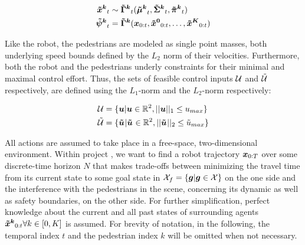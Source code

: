 \begin{align}
\xped[k]_t &\sim \distmodel[k]_t(\muped[k]_t, \sigmaped[k]_t, \piped[k]_t) \\
\dist[k]_t &= \distmodel[k] (\x_{0:t}, \xped[0]_{0:t}, \hdots, \xped[K]_{0:t})
\end{align}

Like the robot, the pedestrians are modeled as single point masses, both underlying speed bounds defined by the $L_2$ norm of their velocities. Furthermore, both the robot and the pedestrians underly constraints for their minimal and maximal control effort. Thus, the sets of feasible control inputs $
\mathcal{U}$ and $\mathcal{\tilde{U}}$ respectively, are defined using the $L_1$-norm and the $L_2$-norm respectively:

\begin{align}
\uset &= \{\u | \u \in \mathbb{R}^2, ||\u||_1 \leq u_{max}\} \\
\upedset &= \{\uped[] | \uped[] \in \mathbb{R}^2, ||\uped[]||_2 \leq \tilde{u}_{max}\} 
\label{eq:controls_bounds}
\end{align}
 
All actions are assumed to take place in a free-space, two-dimensional environment. 
\newline
Within project \project, we want to find a robot trajectory $\boldsymbol{x}_{0:T}$ over some discrete-time horizon $N$ that makes trade-offs between minimizing the travel time from its current state to some goal state in $\mathcal{X}_f = \{\boldsymbol{g} | \boldsymbol{g} \in \mathcal{X} \}$ on the one side and the interference with the pedestrians in the scene, concerning its dynamic as well as safety boundaries, on the other side. For further simplification, perfect knowledge about the current and all past states of surrounding agents $\xped[k]_{0:t} \forall k \in [0, K]$ is assumed.
\newline\newline
For brevity of notation, in the following, the temporal index $t$ and the pedestrian index $k$ will be omitted when not necessary.

